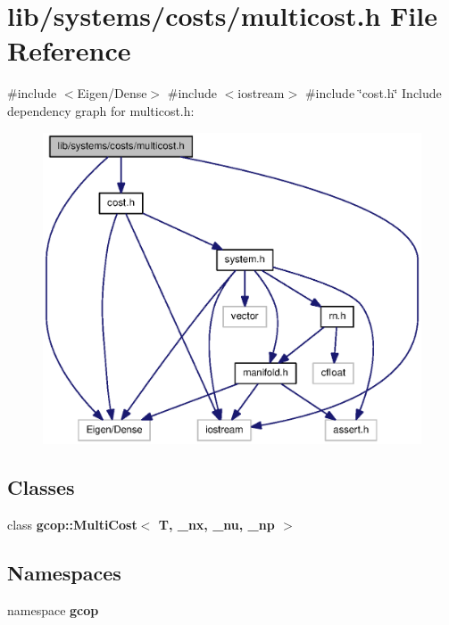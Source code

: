 \section{lib/systems/costs/multicost.h \-File \-Reference}
\label{multicost_8h}
{\ttfamily \#include $<$\-Eigen/\-Dense$>$}\*
{\ttfamily \#include $<$iostream$>$}\*
{\ttfamily \#include \char`\"{}cost.\-h\char`\"{}}\*
\-Include dependency graph for multicost.\-h\-:\nopagebreak
\begin{figure}[H]
\begin{center}
\leavevmode
\includegraphics[width=350pt]{multicost_8h__incl}
\end{center}
\end{figure}
\subsection*{\-Classes}
\begin{DoxyCompactItemize}
\item 
class {\bf gcop\-::\-Multi\-Cost$<$ T, \-\_\-nx, \-\_\-nu, \-\_\-np $>$}
\end{DoxyCompactItemize}
\subsection*{\-Namespaces}
\begin{DoxyCompactItemize}
\item 
namespace {\bf gcop}
\end{DoxyCompactItemize}
